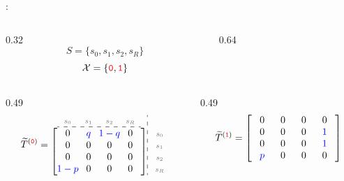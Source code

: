 \documentclass[aspectratio=169,11pt]{beamer}
\newcommand{\uw}[1]{\underline{\smash{#1}}}
\newcommand{\ec}[1]{\makebox[2.15em]{\ensuremath{#1}}}          %
\newcommand{\lc}[1]{\makebox[2.15em]{\ensuremath{\scriptstyle\color{black!55}#1}}} %
\begin{document}
\begin{frame}
  \vspace{0.2em}
  \uw{Example 4}:
  \begin{columns}[c]
    \begin{column}{0.32\textwidth}
      \[ S = \{s_0,s_1,s_2,s_R\} \]
      \[ \mathcal{X} = \{{\color{red}\mathtt{0}},{\color{red}\mathtt{1}}\} \]
    \end{column}
    \begin{column}{0.64\textwidth}
      \begin{center}\scalebox{0.70}{\figExFourRedundant}\end{center}
    \end{column}
  \end{columns}

  \vspace{0.4em}
  \begin{columns}[c]
    \begin{column}{0.49\textwidth}
      \[
        \widetilde{T}^{({\color{red}\mathtt{0}})} =
        \begin{array}{@{}c@{}}
          \begin{array}{@{}c@{}c@{}c@{}c@{}}
            \lc{s_0}&\lc{s_1}&\lc{s_2}&\lc{s_R}\\\hdashline\end{array}\\[0.1em]
          \left[\begin{array}{@{}c@{}c@{}c@{}c@{}}
            \ec{0}&\ec{\color{blue}q}&\ec{\color{blue}1-q}&\ec{0}\\
            \ec{0}&\ec{0}&\ec{0}&\ec{0}\\
            \ec{0}&\ec{0}&\ec{0}&\ec{0}\\
            \ec{\color{blue}1-p}&\ec{0}&\ec{0}&\ec{0}
          \end{array}\right]
        \end{array}
        \begin{array}{:@{\,}l@{}}\\[0.1em]\lc{s_0}\\ \lc{s_1}\\ \lc{s_2}\\ \lc{s_R}\end{array}
      \]
    \end{column}
    \begin{column}{0.49\textwidth}
      \[
        \widetilde{T}^{({\color{red}\mathtt{1}})} =
        \left[\begin{array}{@{}c@{}c@{}c@{}c@{}}
          \ec{0}&\ec{0}&\ec{0}&\ec{0}\\
          \ec{0}&\ec{0}&\ec{0}&\ec{\color{blue}1}\\
          \ec{0}&\ec{0}&\ec{0}&\ec{\color{blue}1}\\
          \ec{\color{blue}p}&\ec{0}&\ec{0}&\ec{0}
        \end{array}\right]
      \]
    \end{column}
  \end{columns}
\end{frame}
\end{document}
